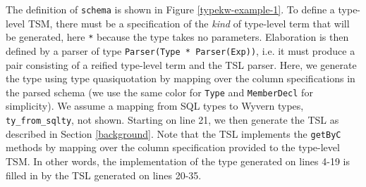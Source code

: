 \documentclass{sig-alternate}[10pt]
\newcommand{\lstinlinew}[1]{\lstinline[style=wyvern]{#1}}
\newcommand{\dbshcemacolor}[1]{\textcolor[HTML]{5AC3D1}{#1}}
\begin{document}
The definition of \lstinlinew{schema} is shown in Figure \ref{typekw-example-1}. To define a type-level TSM, there must be a specification of the \emph{kind} of type-level term that will be generated, here \lstinlinew{*} because the type takes no parameters. Elaboration is then defined by a parser of type \lstinlinew{Parser(Type * Parser(Exp))}, i.e. it must produce a pair consisting of a reified type-level term and the TSL parser. Here, we generate the type using type quasiquotation by mapping over the column specifications in the parsed schema (we use the same color for \lstinlinew{Type} and \lstinlinew{MemberDecl} for simplicity). We assume a mapping from SQL types to Wyvern types, \lstinlinew{ty_from_sqlty}, not shown. Starting on line 21, we then generate the TSL as described in Section \ref{background}. Note  that the TSL implements the \lstinlinew{getByC} methods by mapping over the column specification provided to the type-level TSM. In other words, the implementation of the type generated on lines 4-19 is filled in by the TSL generated on lines 20-35.




\end{document}

